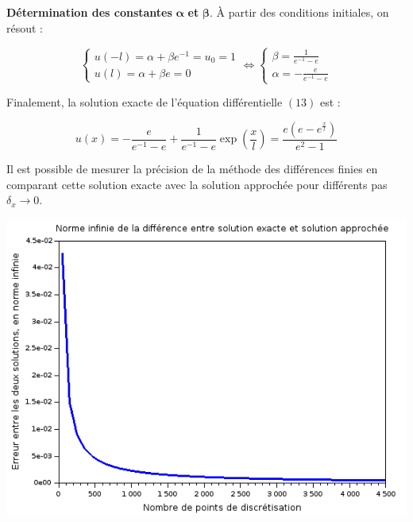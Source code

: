 \documentclass[a4paper,11pt]{article}
\theoremstyle{nonumberplain}
\theoremstyle{nonumberplain}
\theoremstyle{nonumberplain}
\begin{document}
    \newpage\textbf{Détermination des constantes }$\mathbf{\alpha}$\textbf{ et }$\mathbf{\beta}$.
    \`A partir des conditions initiales, on résout :

    \begin{calculs}
        $$
        \begin{cases}
            u(-l) = \alpha + \beta e^{-1} = u_0 = 1 \\
            u(l) = \alpha + \beta e = 0
        \end{cases}
        \iff
        \begin{cases}
          \beta = \frac{1}{e^{-1} - e} \\
          \alpha = -\frac{e}{e^{-1} - e}
        \end{cases}
        $$
    \end{calculs}

    \medskip
    Finalement, la solution exacte de l'équation différentielle $(13)$ est :

    \begin{calculs}
        $$ u(x) = -\frac{e}{e^{-1} - e} + \frac{1}{e^{-1} - e} \exp(\frac{x}{l}) = \frac{e(e - e^{\frac{x}{l}})}{e^2 - 1}$$
    \end{calculs}

    \medskip
    Il est possible de mesurer la précision de la méthode des différences finies
    en comparant cette solution exacte avec la solution approchée pour
    différents pas $\delta_x \rightarrow 0$.

    \begin{center}
        \includegraphics[scale=0.68]{images/q7_ps3.png}
    \end{center}
\end{document}
